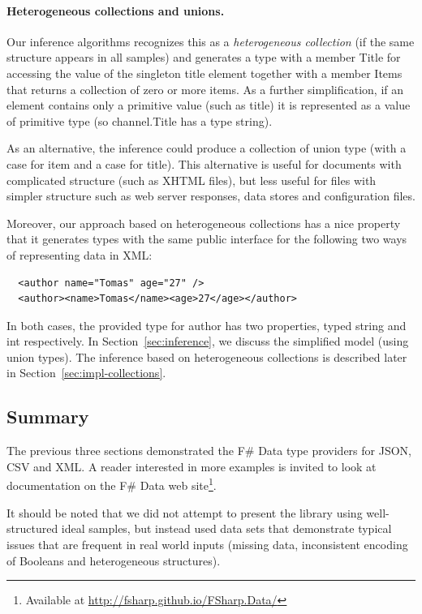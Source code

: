 \documentclass[preprint]{sigplanconf}
\newcommand{\ident}[1]{\textnormal{\sffamily #1}}
\begin{document}
\paragraph{Heterogeneous collections and unions.}
Our inference algorithms recognizes this as a \emph{heterogeneous collection} (if the same structure 
appears in all samples) and generates a type with a member \ident{Title} for accessing the value 
of the singleton \ident{title} element together with a member \ident{Items} that returns a 
collection of zero or more items. As a further simplification, if an element contains only a 
primitive value (such as \ident{title}) it is represented as a value of primitive type (so 
\ident{channel.Title} has a type \ident{string}).

As an alternative, the inference could produce a collection of union type (with a case for \ident{item}
and a case for \ident{title}). This alternative is useful for documents with complicated structure 
(such as XHTML files), but less useful for files with simpler structure such as web server responses,
data stores and configuration files. 

Moreover, our approach based on heterogeneous collections has a nice property that it generates types
with the same public interface for the following two ways of representing data in XML:
%
{\small{
\begin{verbatim}
  <author name="Tomas" age="27" />
  <author><name>Tomas</name><age>27</age></author>
\end{verbatim}
}}
%
\noindent
In both cases, the provided type for \ident{author} has two properties, typed \ident{string} and 
\ident{int} respectively. In Section~\ref{sec:inference}, we discuss the simplified model (using 
union types). The inference based on heterogeneous collections is described later in 
Section~\ref{sec:impl-collections}.


\subsection{Summary}
The previous three sections demonstrated the F\# Data type providers for JSON, CSV and XML.
A reader interested in more examples is invited to look at documentation on the F\# Data web 
site\footnote{Available at \url{http://fsharp.github.io/FSharp.Data/}}.

It should be noted that we did not attempt to present the library using well-structured ideal 
samples, but instead used data sets that demonstrate typical issues that are frequent in real 
world inputs (missing data, inconsistent encoding of Booleans and heterogeneous structures).
\end{document}

